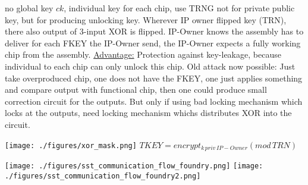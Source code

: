 \documentclass[landscape, a4paper]{article}
\begin{document}
\begin{minipage}[t]{0.2\linewidth}
\begin{betterlist}
\begin{betterlist}
\begin{betterlist}
				\item no global key $ck$, individual key for each chip, use TRNG not for private public key, but for producing unlocking key. Wherever IP owner flipped key (TRN), there also output of 3-input XOR is flipped. IP-Owner knows the assembly has to deliver for each FKEY the IP-Owner send, the IP-Owner expects a fully working chip from the assembly. \underline{Advantage:} Protection against key-leakage, because individual to each chip can only unlock this chip. Old attack now possible: Just take overproduced chip, one does not have the FKEY, one just applies something and compare output with functional chip, then one could produce small correction circuit for the outputs. But only if using bad locking mechanism which locks at the outputs, need locking mechanism whichs distributes XOR into the circuit. %

				\texttt{[image: ./figures/xor\_mask.png]}
				$TKEY = encrypt_{k\,priv\,IP-Owner}(mod\,TRN)$

				\texttt{[image: ./figures/sst\_communication\_flow\_foundry.png]}
				\texttt{[image: ./figures/sst\_communication\_flow\_foundry2.png]}
			\end{betterlist}
		\end{betterlist}
	\end{betterlist}
\end{minipage}
\end{document}
